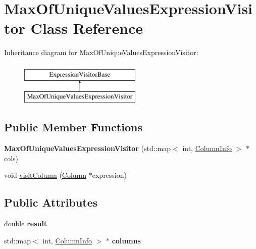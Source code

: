 \hypertarget{class_max_of_unique_values_expression_visitor}{\section{Max\+Of\+Unique\+Values\+Expression\+Visitor Class Reference}
\label{class_max_of_unique_values_expression_visitor}
}
Inheritance diagram for Max\+Of\+Unique\+Values\+Expression\+Visitor\+:\begin{figure}[H]
\begin{center}
\leavevmode
\includegraphics[height=2.000000cm]{class_max_of_unique_values_expression_visitor}
\end{center}
\end{figure}
\subsection*{Public Member Functions}
\begin{DoxyCompactItemize}
\item 
\hypertarget{class_max_of_unique_values_expression_visitor_adf863a6e2406f90466e4f4decab1f4e4}{{\bfseries Max\+Of\+Unique\+Values\+Expression\+Visitor} (std\+::map$<$ int, \hyperlink{class_column_info}{Column\+Info} $>$ $\ast$cols)}\label{class_max_of_unique_values_expression_visitor_adf863a6e2406f90466e4f4decab1f4e4}

\item 
void \hyperlink{class_max_of_unique_values_expression_visitor_a1e924d4d6d63474f401adc0c8ba6a455}{visit\+Column} (\hyperlink{class_column}{Column} $\ast$expression)
\end{DoxyCompactItemize}
\subsection*{Public Attributes}
\begin{DoxyCompactItemize}
\item 
\hypertarget{class_max_of_unique_values_expression_visitor_a4d1359a778ac14a3709c63bff3a01383}{double {\bfseries result}}\label{class_max_of_unique_values_expression_visitor_a4d1359a778ac14a3709c63bff3a01383}

\item 
\hypertarget{class_max_of_unique_values_expression_visitor_a1f0ca5cd4e5fd0eb513fa64ea21ecae6}{std\+::map$<$ int, \hyperlink{class_column_info}{Column\+Info} $>$ $\ast$ {\bfseries columns}}\label{class_max_of_unique_values_expression_visitor_a1f0ca5cd4e5fd0eb513fa64ea21ecae6}

\end{DoxyCompactItemize}



